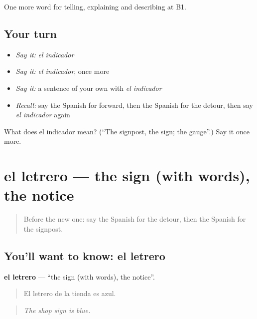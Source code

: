 \begin{grammarlens}[title={What you've built}]
One more word for telling, explaining and describing at B1.
\end{grammarlens}

\subsection*{Your turn}
\begin{itemize}
\raggedright
  \item \emph{Say it:} \emph{el indicador}
  \item \emph{Say it:} \emph{el indicador}, once more
  \item \emph{Say it:} a sentence of your own with \emph{el indicador}
  \item \emph{Recall:} say the Spanish for forward, then the Spanish for the detour, then say \emph{el indicador} again
\end{itemize}

\begin{tcolorbox}[breakable,colback=teal!4,colframe=teal!35!black,title={Before you move on}]
What does el indicador mean? (\textquotedblleft{}The signpost, the sign; the gauge\textquotedblright{}.) Say it once more.
\end{tcolorbox}
\section[el letrero]{el letrero — the sign (with words), the notice}

\label{lesson:ES-C672-letrero}



\begin{quote}
Before the new one: say the Spanish for the detour, then the Spanish for the signpost.
\end{quote}

\subsection*{You'll want to know: el letrero}
\textbf{el letrero} — \textquotedblleft{}the sign (with words), the notice\textquotedblright{}.

\begin{quote}
El letrero de la tienda es azul.
\end{quote}

\begin{quote}
\emph{The shop sign is blue.}
\end{quote}

